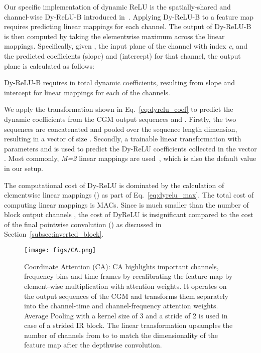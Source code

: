 \documentclass[lettersize,journal]{IEEEtran}
\begin{document}
Our specific implementation of dynamic ReLU is the spatially-shared and channel-wise Dy-ReLU-B introduced in~\cite{chen2020dynamic_relu}. Applying Dy-ReLU-B to a feature map requires predicting  linear mappings for each channel. The output of Dy-ReLU-B is then computed by taking the elementwise maximum across the  linear mappings. Specifically, given , the input plane of the channel with index \textit{c}, and the predicted coefficients  (slope) and  (intercept) for that channel, the output plane  is calculated as follows:



Dy-ReLU-B requires in total  dynamic coefficients, resulting from slope and intercept for  linear mappings for each of the  channels. 

We apply the transformation shown in Eq.~\ref{eq:dyrelu_coef} to predict the dynamic coefficients from the CGM output sequences  and . Firstly, the two sequences are concatenated and pooled over the sequence length dimension, resulting in a vector of size . Secondly, a trainable linear transformation with parameters  and  is used to predict the Dy-ReLU coefficients collected in the vector . Most commonly, \textit{M=2} linear mappings are used~\cite{chen2020dynamic_relu}, which is also the default value in our setup.



The computational cost of Dy-ReLU is dominated by the calculation of elementwise linear mappings () as part of Eq.~\ref{eq:dyrelu_max}. The total cost of computing  linear mappings is
 MACs. Since  is much smaller than the number of block output channels , the cost of DyReLU is insignificant compared to the cost of the final pointwise convolution () as discussed in Section~\ref{subsec:inverted_block}. 

\begin{figure}[t]
\centering
{\texttt{[image: figs/CA.png]}}
\caption{Coordinate Attention (CA): CA highlights important channels, frequency bins and time frames by recalibrating the feature map by element-wise multiplication with attention weights. It operates on the output sequences of the CGM and transforms them separately into the channel-time  and channel-frequency  attention weights. Average Pooling with a kernel size of 3 and a stride of 2 is used in case of a strided IR block. The linear transformation upsamples the number of channels from  to  to match the dimensionality of the feature map after the depthwise convolution.}\label{fig:ca}\end{figure}
\end{document}
